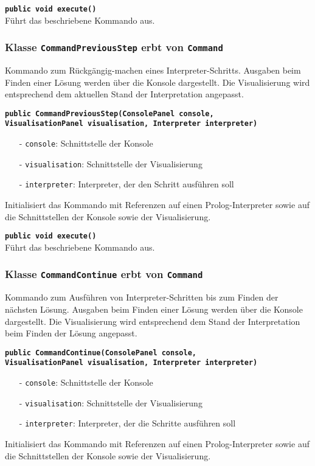 \documentclass[parskip=full,11pt,twoside]{scrartcl}
\begin{document}
\textbf{\texttt{public void execute()}}\\
Führt das beschriebene Kommando aus.

\subsubsection{Klasse \texttt{CommandPreviousStep} erbt von \texttt{Command}}

Kommando zum Rückgängig-machen eines Interpreter-Schritts. Ausgaben beim Finden einer Lösung werden über die Konsole dargestellt. Die Visualisierung wird entsprechend dem aktuellen Stand der Interpretation angepasst.

\textbf{\texttt{public CommandPreviousStep(ConsolePanel console,\\VisualisationPanel visualisation, Interpreter interpreter)}}
\begin{itemize}[noitemsep]
	\item[-] \texttt{console}: Schnittstelle der Konsole
	\item[-] \texttt{visualisation}: Schnittstelle der Visualisierung
	\item[-] \texttt{interpreter}: Interpreter, der den Schritt ausführen soll
\end{itemize}
Initialisiert das Kommando mit Referenzen auf einen Prolog-Interpreter sowie auf die Schnittstellen der Konsole sowie der Visualisierung.

\textbf{\texttt{public void execute()}}\\
Führt das beschriebene Kommando aus.

\subsubsection{Klasse \texttt{CommandContinue} erbt von \texttt{Command}}

Kommando zum Ausführen von Interpreter-Schritten bis zum Finden der nächsten Lösung. Ausgaben beim Finden einer Lösung werden über die Konsole dargestellt. Die Visualisierung wird entsprechend dem Stand der Interpretation beim Finden der Lösung angepasst.

\textbf{\texttt{public CommandContinue(ConsolePanel console,\\VisualisationPanel visualisation, Interpreter interpreter)}}
\begin{itemize}[noitemsep]
	\item[-] \texttt{console}: Schnittstelle der Konsole
	\item[-] \texttt{visualisation}: Schnittstelle der Visualisierung
	\item[-] \texttt{interpreter}: Interpreter, der die Schritte ausführen soll
\end{itemize}
Initialisiert das Kommando mit Referenzen auf einen Prolog-Interpreter sowie auf die Schnittstellen der Konsole sowie der Visualisierung.
\end{document}
